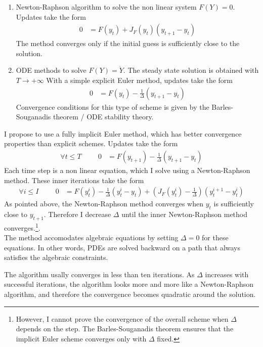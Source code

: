 \documentclass[english]{article}
\begin{document}
\begin{enumerate}
	\item Newton-Raphson algorithm to solve the non linear system $F (Y ) = 0$. Updates take the form
	\begin{align*}
		0 &= F(y_{t}) + J_{F}(y_t) (y_{t+1} - y_t)
	\end{align*}
	The method converges only if the initial guess is sufficiently close to the solution. 
	\item ODE methods to solve $F(Y) = \dot{Y}$. The steady state solution is obtained with $T\rightarrow +\infty$
	With a simple explicit Euler method, updates take the form
	\begin{align*}
		0&= F(y_t) - \frac{1}{\Delta} (y_{t+1} -y_{t})
	\end{align*}
	Convergence conditions for this type of scheme is given by the Barles-Souganadis theorem / ODE stability theory. 
\end{enumerate}
I propose to use a fully implicit Euler method, which has better convergence properties than explicit schemes.  Updates take the form 
\begin{align*}
	\forall t \leq T \hspace{1cm} 0&= F(y_{t+1}) - \frac{1}{\Delta}(y_{t+1} -y_{t})
\end{align*}
Each time step is a non linear equation, which I solve using a Newton-Raphson method. These inner iterations take the form
\begin{align*}
	\forall i \leq I \hspace{1cm}	0 &= F(y_{t}^i) - \frac{1}{\Delta}(y_{t}^{i} -y_{t}) + (J_{F}(y_t^i) -  \frac{1}{\Delta})(y^{i+1}_{t} - y_t^i)
\end{align*}
As pointed above, the Newton-Raphson method converges when $y_t$ is sufficiently close to $y_{t+1}$. Therefore I decrease $\Delta$ until the inner Newton-Raphson method converges.\footnote{However, I cannot prove the convergence of the overall scheme when $\Delta$ depends on the step. The Barles-Souganadis theorem ensures that the implicit Euler scheme converges only with $\Delta$ fixed. }.\\
The method accomodates algebraic equations by setting $\Delta = 0$ for these equations. In other words, PDEs are solved backward on a path that always satisfies the algebraic constraints.


The algorithm usally converges in less than ten iterations. As $\Delta$ increases with successful iterations, the algorithm looks more and more like a Newton-Raphson algorithm, and therefore the convergence becomes quadratic around the solution.\\
\end{document}
